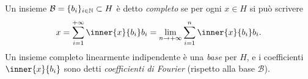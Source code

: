 \begin{definizione} \label{d:insieme-completo}
    Un insieme $\mathcal{B}=\{b_i\}_{i\in\mathbb{N}}\subset H$ è detto \emph{completo} se per ogni $x\in H$ si può scrivere
    \begin{equation}
        x=\sum_{i=1}^{+\infty}\inner{x}{b_i}b_i=\lim_{n\to+\infty}\sum_{i=1}^n\inner{x}{b_i}b_i.
    \end{equation}
    Un insieme completo linearmente indipendente è una \emph{base} per $H$, e i coefficienti $\inner{x}{b_i}$ sono detti \emph{coefficienti di Fourier} (rispetto alla base $\mathcal{B}$).
\end{definizione}
